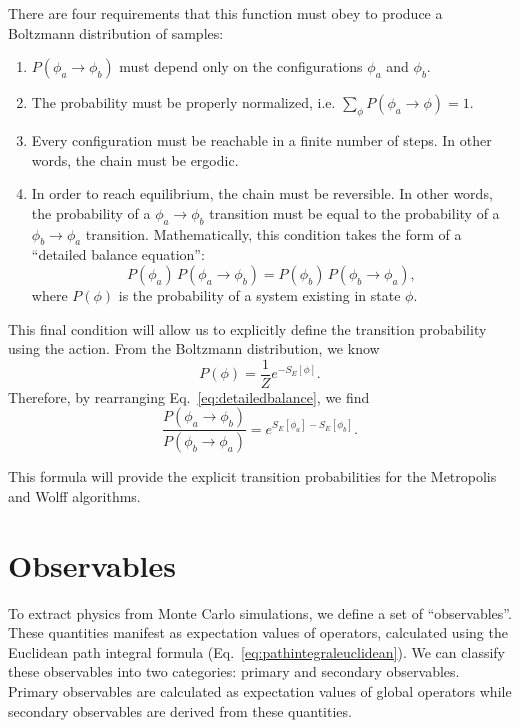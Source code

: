 There are four requirements that this function must obey to produce a Boltzmann distribution of samples:
\begin{enumerate}
    \item $P(\phi_a \rightarrow \phi_b)$ must depend only on the configurations $\phi_a$ and $\phi_b$.
    \item The probability must be properly normalized, i.e. $\sum_{\phi} P(\phi_a \rightarrow \phi) = 1$.
    \item Every configuration must be reachable in a finite number of steps. In other words, the chain must be ergodic.
    \item In order to reach equilibrium, the chain must be reversible. In other words, the probability of a $\phi_a\rightarrow\phi_b$ transition must be equal to the probability of a $\phi_b\rightarrow\phi_a$ transition. Mathematically, this condition takes the form of a ``detailed balance equation'':
\begin{equation}
    \label{eq:detailedbalance}
    P(\phi_a)\,P(\phi_a\rightarrow\phi_b) = P(\phi_b)\,P(\phi_b\rightarrow\phi_a),
\end{equation}
where $P(\phi)$ is the probability of a system existing in state $\phi$.
\end{enumerate}

This final condition will allow us to explicitly define the transition probability using the action. From the Boltzmann distribution, we know
\begin{equation}
    P(\phi) = \frac{1}{Z} e^{-S_E[\phi]}.
\end{equation}
Therefore, by rearranging Eq.~\ref{eq:detailedbalance}, we find
\begin{equation}
    \label{eq:detailedbalance2}
    \frac{P(\phi_a\rightarrow\phi_b)}{P(\phi_b\rightarrow\phi_a)} = e^{S_E[\phi_a] - S_E[\phi_b]}.
\end{equation}

This formula will provide the explicit transition probabilities for the Metropolis and Wolff algorithms.





\section{Observables}

To extract physics from Monte Carlo simulations, we define a set of ``observables''. These quantities manifest as expectation values of operators, calculated using the Euclidean path integral formula (Eq.~\ref{eq:pathintegraleuclidean}). We can classify these observables into two categories: primary and secondary observables. Primary observables are calculated as expectation values of global operators while secondary observables are derived from these quantities.

